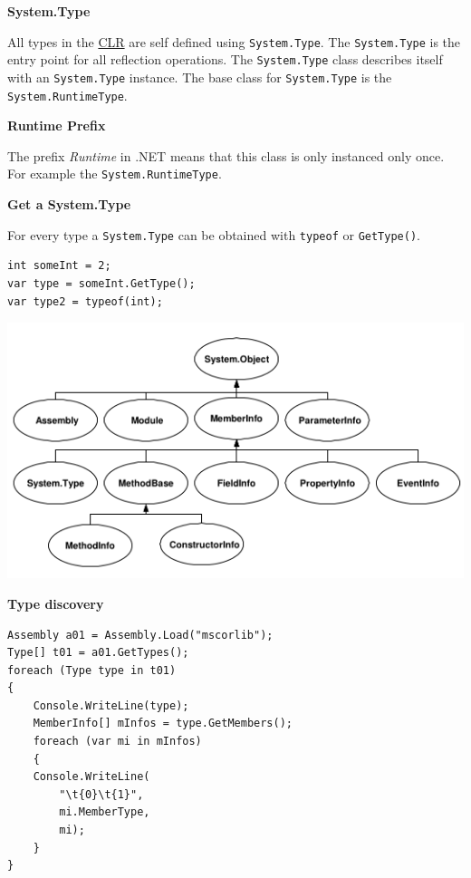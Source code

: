 \documentclass[11pt,twoside,landscape]{article}
\begin{document}
\begin{multicols}{3}
\textbf{System.Type}

All types in the \href{../../../roam/20211003114644-common_language_runtime.org}{CLR} are self defined using \texttt{System.Type}.
The \texttt{System.Type} is the entry point for all reflection operations.
The \texttt{System.Type} class describes itself with an \texttt{System.Type} instance.
The base class for \texttt{System.Type} is the \texttt{System.RuntimeType}.

\textbf{Runtime Prefix}

The prefix \emph{Runtime} in .NET means that this class is only instanced only once.
For example the \texttt{System.RuntimeType}.

\textbf{Get a System.Type}

For every type a \texttt{System.Type} can be obtained with \texttt{typeof} or \texttt{GetType()}.

\lstset{language=csharp,label= ,caption= ,captionpos=b,numbers=none}
\begin{lstlisting}
int someInt = 2;
var type = someInt.GetType();
var type2 = typeof(int);
\end{lstlisting}


\begin{center}
\includegraphics[width=.9\linewidth]{img/type_hierarchy_reflection.png}
\label{org2b5d679}
\end{center}

\textbf{Type discovery}

\lstset{language=csharp,label= ,caption= ,captionpos=b,numbers=none}
\begin{lstlisting}
Assembly a01 = Assembly.Load("mscorlib");
Type[] t01 = a01.GetTypes();
foreach (Type type in t01)
{
    Console.WriteLine(type);
    MemberInfo[] mInfos = type.GetMembers();
    foreach (var mi in mInfos)
    {
	Console.WriteLine(
	    "\t{0}\t{1}",
	    mi.MemberType,
	    mi);
    }
}
\end{lstlisting}


\end{multicols}
\end{document}
